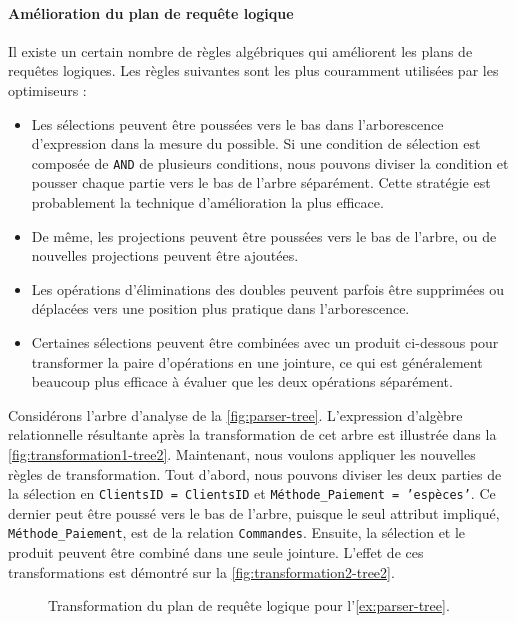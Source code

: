 \paragraph{Amélioration du plan de requête logique}
Il existe un certain nombre de règles algébriques qui améliorent les plans de requêtes logiques. Les règles suivantes sont les plus couramment utilisées par les optimiseurs \cite{GarciaMolina08, Elmasri08}:
\begin{itemize}
 \item Les sélections peuvent être poussées vers le bas dans l'arborescence d'expression dans la mesure du possible. Si une condition de sélection est composée de \texttt{AND} de plusieurs conditions, nous pouvons diviser la condition et pousser chaque partie vers le bas de l'arbre séparément. Cette stratégie est probablement la technique d'amélioration la plus efficace.
 \item De même, les projections peuvent être poussées vers le bas de l'arbre, ou de nouvelles projections peuvent être ajoutées.
 \item Les opérations d'éliminations des doubles peuvent parfois être supprimées ou déplacées vers une position plus pratique dans l'arborescence.
 \item Certaines sélections peuvent être combinées avec un produit ci-dessous pour transformer la paire d'opérations en une jointure, ce qui est généralement beaucoup plus efficace à évaluer que les deux opérations séparément.
\end{itemize}

\begin{example}\label{ex:transformation-query2}
 Considérons l'arbre d'analyse de la \ref{fig:parser-tree}. L'expression d'algèbre relationnelle résultante après la transformation de cet arbre est illustrée dans la \ref{fig:transformation1-tree2}. Maintenant, nous voulons appliquer les nouvelles règles de transformation. Tout d'abord, nous pouvons diviser les deux parties de la sélection en \texttt{ClientsID = ClientsID} et \texttt{Méthode\_Paiement = 'espèces'}. Ce dernier peut être poussé vers le bas de l'arbre, puisque le seul attribut impliqué, \texttt{Méthode\_Paiement}, est de la relation \texttt{Commandes}. Ensuite, la sélection et le produit peuvent être combiné dans une seule jointure. L'effet de ces transformations est démontré sur la \ref{fig:transformation2-tree2}.
\end{example}

\begin{figure}
  \centering
  \footnotesize
  \quad
  \caption{Transformation du plan de requête logique pour l'\ref{ex:parser-tree}.}\label{fig:transformation-tree2}
\end{figure}

